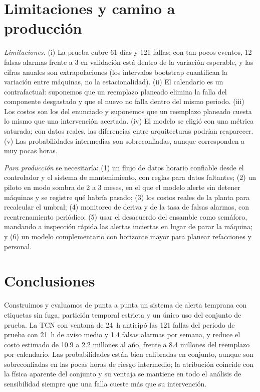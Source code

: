 \documentclass[conference,letterpaper]{IEEEtran}
\begin{document}
\section{Limitaciones y camino a producción}\label{sec:prod}
\textit{Limitaciones.} (i) La prueba cubre 61 días y 121 fallas; con tan pocos eventos, 12 falsas alarmas frente a 3 en validación está dentro de la variación esperable, y las cifras anuales son extrapolaciones (los intervalos bootstrap cuantifican la variación entre máquinas, no la estacionalidad). (ii) El calendario es un contrafactual: suponemos que un reemplazo planeado elimina la falla del componente desgastado y que el nuevo no falla dentro del mismo periodo. (iii) Los costos son los del enunciado y suponemos que un reemplazo planeado cuesta lo mismo que una intervención acertada. (iv) El modelo se eligió con una métrica saturada; con datos reales, las diferencias entre arquitecturas podrían reaparecer. (v) Las probabilidades intermedias son sobreconfiadas, aunque corresponden a muy pocas horas.

\textit{Para producción} se necesitaría: (1) un flujo de datos horario confiable desde el controlador y el sistema de mantenimiento, con reglas para datos faltantes; (2) un piloto en modo sombra de 2 a 3 meses, en el que el modelo alerte sin detener máquinas y se registre qué habría pasado; (3) los costos reales de la planta para recalcular el umbral; (4) monitoreo de deriva y de la tasa de falsas alarmas, con reentrenamiento periódico; (5) usar el desacuerdo del ensamble como semáforo, mandando a inspección rápida las alertas inciertas en lugar de parar la máquina; y (6) un modelo complementario con horizonte mayor para planear refacciones y personal.

\section{Conclusiones}
Construimos y evaluamos de punta a punta un sistema de alerta temprana con etiquetas sin fuga, partición temporal estricta y un único uso del conjunto de prueba. La TCN con ventana de 24~h anticipó las 121 fallas del periodo de prueba con 21~h de aviso medio y 1.4 falsas alarmas por semana, y reduce el costo estimado de 10.9 a 2.2 millones al año, frente a 8.4 millones del reemplazo por calendario. Las probabilidades están bien calibradas en conjunto, aunque son sobreconfiadas en las pocas horas de riesgo intermedio; la atribución coincide con la física aparente del conjunto y su ventaja se mantiene en todo el análisis de sensibilidad siempre que una falla cueste más que su intervención.
\end{document}
